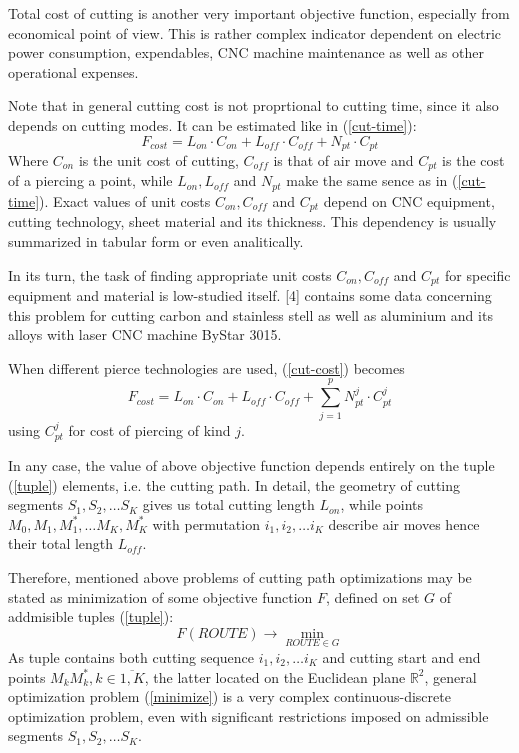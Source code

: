 \documentclass{../download/tPRS2e}
\begin{document}
Total cost of cutting is another very important
objective function,
especially from economical point of view.
This is rather complex indicator dependent on
electric power consumption,
expendables,
CNC machine maintenance
as well as other operational expenses.

Note that in general cutting cost is not 
proprtional to cutting time,
since it also depends on cutting modes.
It can be estimated like in (\ref{cut-time}):
\begin{equation}
    F_{cost} = L_{on}\cdot C_{on} + L_{off}\cdot C_{off} + N_{pt} \cdot C_{pt}
    \label{cut-cost}
\end{equation}
Where
$C_{on}$ is the unit cost of cutting,
$C_{off}$ is that of air move and
$C_{pt}$ is the cost of a piercing a point,
while $L_{on}, L_{off}$ and $N_{pt}$
make the same sence as in (\ref{cut-time}).
Exact values of unit costs
$C_{on}, C_{off}$ and $C_{pt}$
depend on CNC equipment, cutting technology,
sheet material and its thickness.
This dependency is usually summarized
in tabular form or even analitically.

In its turn,
the task of finding appropriate unit costs
$C_{on}, C_{off}$ and $C_{pt}$
for specific equipment and material 
is  low-studied itself.
[4] contains some data concerning this problem
for cutting carbon and stainless stell
as well as aluminium and its alloys
with laser CNC machine ByStar 3015.

When different pierce technologies are used,
(\ref{cut-cost}) becomes
\begin{equation}
    F_{cost} = L_{on}\cdot C_{on} + L_{off}\cdot C_{off}
    + \sum_{j=1}^p N_{pt}^j \cdot C_{pt}^j
    \label{piercings-cost}
\end{equation}
using $C_{pt}^j$ for
cost of piercing of kind $j$.

In any case,
the value of above objective function
depends entirely on the tuple (\ref{tuple})
elements,
i.e. the cutting path.
In detail,
the geometry of cutting segments
$S_1, S_2, \dots S_K$ gives us
total cutting length $L_{on}$,
while points $M_0, M_1, M_1^*, \dots M_K, M_K^*$
with permutation $i_1, i_2, \dots i_K$
describe air moves hence their total length $L_{off}$.

Therefore,
mentioned above problems
of cutting path optimizations may be
stated as minimization of some objective function $F$,
defined on set $G$ of addmisible tuples (\ref{tuple}):
\begin{equation}
    F(ROUTE) \to \min_{ROUTE \in G}
    \label{minimize}
\end{equation}
As tuple contains both
cutting sequence 
$i_1, i_2, \dots i_K$
and cutting start and end points 
$M_kM_k^*, k \in \overline{1, K}$,
the latter located on the Euclidean plane $\mathbb R^2$,
general optimization problem (\ref{minimize})
is a very complex 
continuous-discrete optimization problem,
even with significant restrictions imposed
on admissible segments
$S_1, S_2, \dots S_K$.
\end{document}
